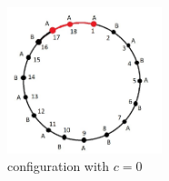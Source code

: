 \documentclass[]{book}
\theoremstyle{definition}
\begin{document}
\begin{figure}[ht]
    \centering
    \includegraphics[width=0.4\textwidth]{figures/t0.jpg}
    \caption{configuration with $c = 0$}
    \label{fig:mesh2}
\end{figure}






	
\end{document}
